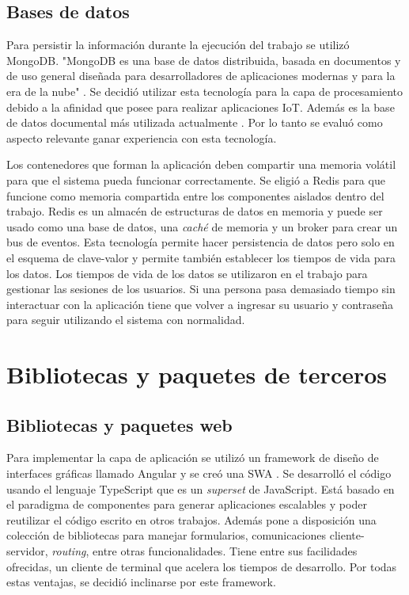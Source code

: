 \subsection{Bases de datos}
Para persistir la información durante la ejecución del trabajo se utilizó MongoDB.
"MongoDB es una base de datos distribuida, basada en documentos y de uso general diseñada para desarrolladores de aplicaciones modernas y para la era de la nube" \citep{WEBSITE:MongoHome}.
Se decidió utilizar esta tecnología para la capa de procesamiento debido a la afinidad que posee para realizar aplicaciones IoT.
Además es la base de datos documental más utilizada actualmente \citep{WEBSITE:DBRanking}.
Por lo tanto se evaluó como aspecto relevante ganar experiencia con esta tecnología.

Los contenedores que forman la aplicación deben compartir una memoria volátil para que el sistema pueda funcionar correctamente.
Se eligió a Redis para que funcione como memoria compartida entre los componentes aislados dentro del trabajo.
Redis \citep{da2015redis} es un almacén de estructuras de datos en memoria y puede ser usado como una base de datos, una \emph{caché} de memoria y un broker para crear un bus de eventos.
Esta tecnología permite hacer persistencia de datos pero solo en el esquema de clave-valor y permite también establecer los tiempos de vida para los datos.
Los tiempos de vida de los datos se utilizaron en el trabajo para gestionar las sesiones de los usuarios.
Si una persona pasa demasiado tiempo sin interactuar con la aplicación tiene que volver a ingresar su usuario y contraseña para seguir utilizando el sistema con normalidad.	
	
\section{Bibliotecas y paquetes de terceros}

\subsection{Bibliotecas y paquetes web}
Para implementar la capa de aplicación se utilizó un framework de diseño de interfaces gráficas llamado Angular y se creó una SWA \citep{mesbah2007migrating}.
Se desarrolló el código usando el lenguaje TypeScript que es un \emph{superset} de JavaScript.
Está basado en el paradigma de componentes para generar aplicaciones escalables y poder reutilizar el código escrito en otros trabajos.
Además pone a disposición una colección de bibliotecas para manejar formularios, comunicaciones cliente-servidor, \emph{routing}, entre otras funcionalidades.
Tiene entre sus facilidades ofrecidas, un cliente de terminal que acelera los tiempos de desarrollo.
Por todas estas ventajas, se decidió inclinarse por este framework.

